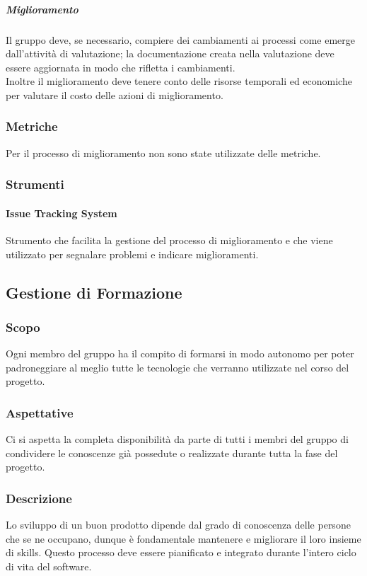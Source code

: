 \subparagraph*{Miglioramento} 
Il gruppo deve, se necessario, compiere dei cambiamenti ai processi come emerge dall'attività di valutazione; la documentazione creata nella valutazione deve essere aggiornata in modo che rifletta i cambiamenti.\\
Inoltre il miglioramento deve tenere conto delle risorse temporali ed economiche per valutare il costo delle azioni di miglioramento.

\subsubsection{Metriche} 
Per il processo di miglioramento non sono state utilizzate delle metriche.

\subsubsection{Strumenti} 
\paragraph{Issue Tracking System} 
Strumento che facilita la gestione del processo di miglioramento e che viene utilizzato per segnalare problemi e indicare miglioramenti.


\newpage

\subsection{Gestione di Formazione}
\subsubsection{Scopo}
Ogni membro del gruppo ha il compito di formarsi in modo autonomo per poter padroneggiare al meglio tutte le tecnologie che verranno utilizzate nel corso del progetto.


\subsubsection{Aspettative}
Ci si aspetta la completa disponibilità da parte di tutti i membri del gruppo di condividere le conoscenze già possedute o realizzate durante tutta la fase del progetto.

\subsubsection{Descrizione}
Lo sviluppo di un buon prodotto dipende dal grado di conoscenza delle persone che se ne occupano, dunque è fondamentale mantenere e migliorare il loro insieme di skills.
Questo processo deve essere pianificato e integrato durante l'intero ciclo di vita del software.

